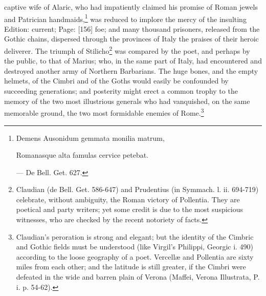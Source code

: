 captive wife of Alaric, who had impatiently claimed his promise of Roman jewels and Patrician handmaids,\footnote{Demens Ausonidum gemmata monilia matrum,

Romanasque alta famulas cervice petebat.

\texthebrew{—} De Bell. Get. 627.} was reduced to implore the mercy of the insulting Edition: current; Page: [156] foe; and many thousand prisoners, released from the Gothic chains, dispersed through the provinces of Italy the praises of their heroic deliverer. The triumph of Stilicho\footnote{Claudian (de Bell. Get. 586-647) and Prudentius (in Symmach. l. ii. 694-719) celebrate, without ambiguity, the Roman victory of Pollentia. They are poetical and party writers; yet some credit is due to the most suspicious witnesses, who are checked by the recent notoriety of facts.} was compared by the poet, and perhaps by the public, to that of Marius; who, in the same part of Italy, had encountered and destroyed another army of Northern Barbarians. The huge bones, and the empty helmets, of the Cimbri and of the Goths would easily be confounded by succeeding generations; and posterity might erect a common trophy to the memory of the two most illustrious generals who had vanquished, on the same memorable ground, the two most formidable enemies of Rome.\footnote{Claudian\texthebrew{}’s peroration is strong and elegant; but the identity of the Cimbric and Gothic fields must be understood (like Virgil\texthebrew{}’s Philippi, Georgic i. 490) according to the loose geography of a poet. Vercellæ and Pollentia are sixty miles from each other; and the latitude is still greater, if the Cimbri were defeated in the wide and barren plain of Verona (Maffei, Verona Illustrata, P. i. p. 54-62).}

